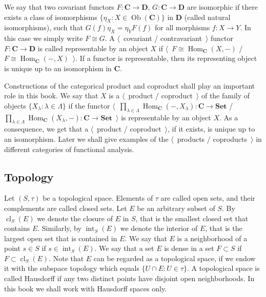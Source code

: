 We say that two covariant functors $F:\mathbf{C}\to\mathbf{D}$,
$G:\mathbf{C}\to\mathbf{D}$ are isomorphic if there exists a class of
isomorphisms $ \{\eta_X:X\in\operatorname{Ob}(\mathbf{C}) \}$ in $\mathbf{D}$
(called natural isomorphisms), such that $G(f)\eta_X=\eta_Y F(f)$ for all morphisms
$f:X\to Y$. In this case we simply write $F\cong G$. A $\langle$~covariant /
contravariant~$\rangle$ functor $F:\mathbf{C}\to\mathbf{D}$ is called
representable by an object $X$ if
$\langle$~$F\cong\operatorname{Hom}_{\mathbf{C}}(X,-)$ /
$F\cong\operatorname{Hom}_{\mathbf{C}}(-,X)$~$\rangle$. If a functor is
representable, then its representing object is unique up to an isomorphism in
$\mathbf{C}$.

Constructions of the categorical product and coproduct shall play an important role
in this book. We say that $X$ is a $\langle$~product / coproduct~$\rangle$
of the family of objects $ \{X_\lambda:\lambda\in\Lambda \}$ if the functor
$\langle$~$
\prod_{\lambda\in\Lambda}\operatorname{Hom}_{\mathbf{C}}(-,X_{\lambda})
:\mathbf{C}\to\mathbf{Set}$
/
$
\prod_{\lambda\in\Lambda}\operatorname{Hom}_{\mathbf{C}}(X_{\lambda},-)
:\mathbf{C}\to\mathbf{Set}$~$\rangle$
is representable by an object $X$. As a consequence, we get that a
$\langle$~product / coproduct~$\rangle$, if it exists, is unique up to an
isomorphism. Later we shall give examples of the $\langle$~products /
coproducts~$\rangle$ in different categories of functional analysis. 



\subsection{
  Topology}\label{SubSectionTopology}

Let $(S,\tau)$ be a topological space. Elements of $\tau$ are called open sets,
and their complements are called closed sets. Let $E$ be an arbitrary subset of
$S$. By $\operatorname{cl}_S(E)$ we denote the closure of $E$ in $S$, that is
the smallest closed set that contains $E$. Similarly, by
$\operatorname{int}_S(E)$ we denote the interior of $E$, that is the largest
open set that is contained in $E$. We say that $E$ is a neighborhood of a point 
$s\in S$ if $s\in \operatorname{int}_S(E)$. We say that a set $E$ is dense 
in a set $F\subset S$ if $F\subset\operatorname{cl}_S(E)$. Note that $E$ can 
be regarded as a topological space, if we endow it with the subspace topology 
which equals $\{U\cap E:U\in\tau \}$. A topological space is called Hausdorff if any two
distinct points have disjoint open neighborhoods. In this book we shall work
with Hausdorff spaces only.

